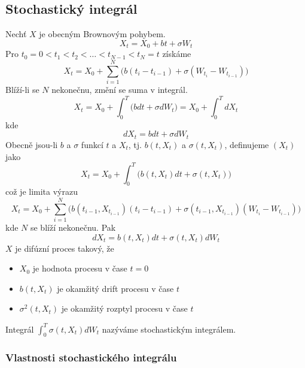 \documentclass[a4paper]{book}
\begin{document}
\subsection{Stochastický integrál}

Nechť $X$ je obecným Brownovým pohybem.
\begin{equation*}
X_t = X_0 + bt + \sigma W_t
\end{equation*}
Pro $t_0 = 0 < t_1 < t_2 < \dots < t_{N-1} < t_N = t$ získáme
\begin{equation*}
X_t = X_0 + \sum_{i=1}^N \Big( b(t_i - t_{i-1}) + \sigma(W_{t_i} - W_{t_{i-1}}) \Big)
\end{equation*}
Blíží-li se $N$ nekonečnu, změní se suma v integrál.
\begin{equation*}
X_t = X_0 + \int_0^T \Big( bdt + \sigma d W_t \Big) = X_0 + \int_0^T d X_t
\end{equation*}
kde
\begin{equation*}
d X_t = b dt + \sigma d W_t
\end{equation*}
Obecně jsou-li $b$ a $\sigma$ funkcí $t$ a $X_t$, tj. $b(t, X_t)$ a $\sigma(t, X_t)$, definujeme $(X_t)$ jako
\begin{equation*}
X_t = X_0 + \int_0^T \Big( b(t, X_t)dt + \sigma(t, X_t) \Big)
\end{equation*}
což je limita výrazu
\begin{equation*}
X_t = X_0 + \sum_{i = 1}^N \Big( b(t_{i-1}, X_{t_{i-1}})(t_i - t_{i-1}) + \sigma(t_{i-1}, X_{t_{i-1}})(W_{t_i} - W_{t_{i-1}})\Big)
\end{equation*}
kde $N$ se blíží nekonečnu. Pak
\begin{equation*}
d X_t = b(t, X_t)dt + \sigma(t, X_t)dW_t
\end{equation*}
$X$ je difúzní proces takový, že
\begin{itemize}
\item $X_0$ je hodnota procesu v čase $t=0$
\item $b(t, X_t)$ je okamžitý drift procesu v čase $t$
\item $\sigma^2(t, X_t)$ je okamžitý rozptyl procesu v čase $t$
\end{itemize}
Integrál $\int_0^T \sigma(t,X_t)dW_t$ nazýváme stochastickým integrálem.

\subsubsection{Vlastnosti stochastického integrálu}
\end{document}
